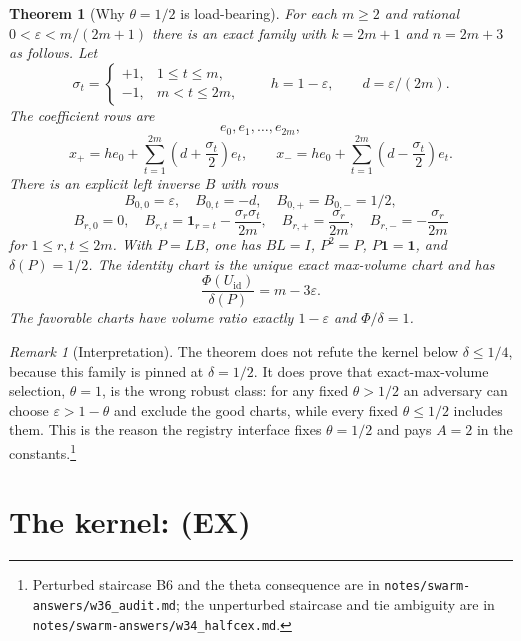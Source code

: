 \documentclass[11pt]{article}
\theoremstyle{plain}
\newtheorem{theorem}{Theorem}
\theoremstyle{definition}
\theoremstyle{remark}
\newtheorem{remark}{Remark}
\newcommand{\one}{\mathbf 1}
\begin{document}
\begin{theorem}[Why $\theta=1/2$ is load-bearing]\label{thm:b6}
For each $m\ge2$ and rational $0<\varepsilon<m/(2m+1)$ there is an exact
family with $k=2m+1$ and $n=2m+3$ as follows.  Let
\[
\sigma_t=\begin{cases}
+1,&1\le t\le m,\\
-1,&m<t\le2m,
\end{cases}
\qquad h=1-\varepsilon,\qquad d=\varepsilon/(2m).
\]
The coefficient rows are
\[
e_0,e_1,\ldots,e_{2m},
\]
\[
x_+=h e_0+\sum_{t=1}^{2m}\left(d+\frac{\sigma_t}{2}\right)e_t,\qquad
x_-=h e_0+\sum_{t=1}^{2m}\left(d-\frac{\sigma_t}{2}\right)e_t.
\]
There is an explicit left inverse $B$ with rows
\[
B_{0,0}=\varepsilon,\quad B_{0,t}=-d,\quad B_{0,+}=B_{0,-}=1/2,
\]
\[
B_{r,0}=0,\quad
B_{r,t}=\mathbf 1_{r=t}-\frac{\sigma_r\sigma_t}{2m},\quad
B_{r,+}=\frac{\sigma_r}{2m},\quad
B_{r,-}=-\frac{\sigma_r}{2m}
\]
for $1\le r,t\le2m$.  With $P=LB$, one has $BL=I$, $P^2=P$,
$P\one=\one$, and $\delta(P)=1/2$.  The identity chart is the unique exact
max-volume chart and has
\[
\frac{\Phi(U_{\mathrm{id}})}{\delta(P)}=m-3\varepsilon.
\]
The favorable charts have volume ratio exactly $1-\varepsilon$ and
$\Phi/\delta=1$.
\end{theorem}

\begin{remark}[Interpretation]
The theorem does not refute the kernel below $\delta\le1/4$, because this
family is pinned at $\delta=1/2$.  It does prove that exact-max-volume
selection, $\theta=1$, is the wrong robust class: for any fixed
$\theta>1/2$ an adversary can choose $\varepsilon>1-\theta$ and exclude the
good charts, while every fixed $\theta\le1/2$ includes them.  This is the
reason the registry interface fixes $\theta=1/2$ and pays $A=2$ in the
constants.\footnote{Perturbed staircase B6 and the theta consequence are in
\texttt{notes/swarm-answers/w36\_audit.md}; the unperturbed staircase and
tie ambiguity are in \texttt{notes/swarm-answers/w34\_halfcex.md}.}
\end{remark}

\section{The kernel: \textup{(EX)}}

\begin{center}
\end{center}
\end{document}
